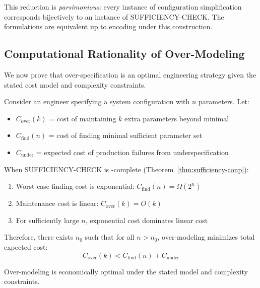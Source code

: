 \begin{remark}
This reduction is \emph{parsimonious}: every instance of configuration simplification corresponds bijectively to an instance of SUFFICIENCY-CHECK. The formulations are equivalent up to encoding under this construction.
\end{remark}

\subsection{Computational Rationality of Over-Modeling}

We now prove that over-specification is an optimal engineering strategy given the stated cost model and complexity constraints.

\begin{theorem}
\label{thm:rational-overmodel}
Consider an engineer specifying a system configuration with $n$ parameters. Let:
\begin{itemize}
\item $C_{\text{over}}(k)$ = cost of maintaining $k$ extra parameters beyond minimal
\item $C_{\text{find}}(n)$ = cost of finding minimal sufficient parameter set
\item $C_{\text{under}}$ = expected cost of production failures from underspecification
\end{itemize}

When SUFFICIENCY-CHECK is \coNP-complete (Theorem~\ref{thm:sufficiency-conp}):
\begin{enumerate}
\item Worst-case finding cost is exponential: $C_{\text{find}}(n) = \Omega(2^n)$
\item Maintenance cost is linear: $C_{\text{over}}(k) = O(k)$
\item For sufficiently large $n$, exponential cost dominates linear cost
\end{enumerate}

Therefore, there exists $n_0$ such that for all $n > n_0$, over-modeling minimizes total expected cost:
\[
C_{\text{over}}(k) < C_{\text{find}}(n) + C_{\text{under}}
\]

Over-modeling is economically optimal under the stated model and complexity constraints.
\end{theorem}

